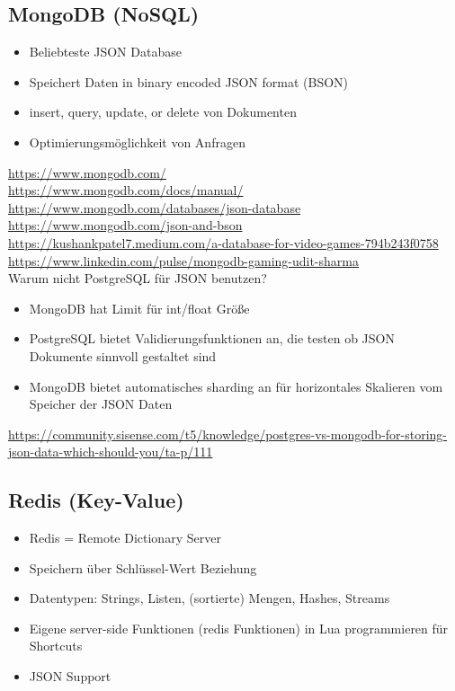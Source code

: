\subsection{MongoDB (NoSQL)}

\begin{itemize}
    \item Beliebteste JSON Database
    \item Speichert Daten in binary encoded JSON format (BSON) 
    \item insert, query, update, or delete von Dokumenten
    \item Optimierungsmöglichkeit von Anfragen
\end{itemize}

\url{https://www.mongodb.com/}\\
\url{https://www.mongodb.com/docs/manual/}\\
\url{https://www.mongodb.com/databases/json-database}\\
\url{https://www.mongodb.com/json-and-bson}\\
\url{https://kushankpatel7.medium.com/a-database-for-video-games-794b243f0758}\\
\url{https://www.linkedin.com/pulse/mongodb-gaming-udit-sharma}\\

Warum nicht PostgreSQL für JSON benutzen?
\begin{itemize}
    \item MongoDB hat Limit für int/float Größe
    \item PostgreSQL bietet Validierungsfunktionen an, die testen ob JSON Dokumente sinnvoll gestaltet sind
    \item MongoDB bietet automatisches sharding an für horizontales Skalieren vom Speicher der JSON Daten
\end{itemize}

\url{https://community.sisense.com/t5/knowledge/postgres-vs-mongodb-for-storing-json-data-which-should-you/ta-p/111}

\subsection{Redis (Key-Value)}

\begin{itemize}
    \item Redis = Remote Dictionary Server
    \item Speichern über Schlüssel-Wert Beziehung
    \item Datentypen: Strings, Listen, (sortierte) Mengen, Hashes, Streams
    \item Eigene server-side Funktionen (redis Funktionen) in Lua programmieren für Shortcuts
    \item JSON Support
\end{itemize}

